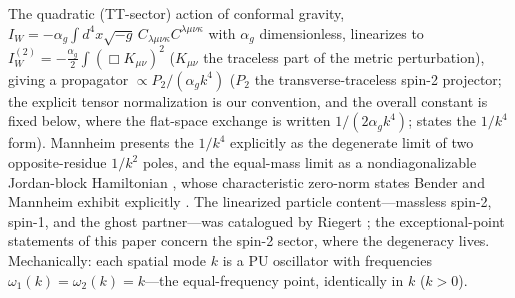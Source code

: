 \documentclass[11pt]{article}
\theoremstyle{definition}
\theoremstyle{remark}
\newcommand{\ag}{\alpha_g}
\begin{document}
The quadratic (TT-sector) action of conformal gravity,
$I_{W}=-\ag\int d^{4}x\sqrt{-g}\,C_{\lambda\mu\nu\kappa}
C^{\lambda\mu\nu\kappa}$ with $\ag$ dimensionless, linearizes to
$I_{W}^{(2)}=-\tfrac{\ag}{2}\int(\Box K_{\mu\nu})^{2}$
($K_{\mu\nu}$ the traceless part of the metric perturbation),
giving a
propagator $\propto P_{2}/(\ag k^{4})$ ($P_{2}$ the
transverse-traceless spin-2 projector; the explicit tensor
normalization is our convention, and the overall constant is fixed
below, where the flat-space exchange is written $1/(2\ag k^{4})$;
\cite{Mannheim2011} states the $1/k^{4}$ form). Mannheim presents the $1/k^{4}$ explicitly as
the degenerate limit of two opposite-residue $1/k^{2}$ poles, and
the equal-mass limit as a nondiagonalizable Jordan-block
Hamiltonian \cite{Mannheim2011,Mannheim2020}, whose characteristic
zero-norm states Bender and Mannheim exhibit
explicitly \cite{BenderMannheim2008PRD}.
The linearized particle content---massless spin-2, spin-1, and the
ghost partner---was catalogued by Riegert \cite{Riegert1984}; the
exceptional-point statements of this paper concern the spin-2
sector, where the degeneracy lives.
Mechanically: each spatial mode $k$ is a PU oscillator
\cite{PaisUhlenbeck1950} with frequencies $\omega_{1}(k)=
\omega_{2}(k)=k$---the equal-frequency point, identically in $k$
($k>0$).
\end{document}
